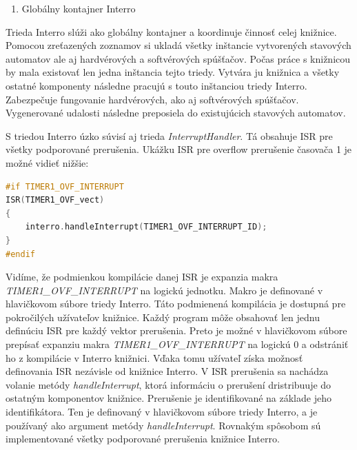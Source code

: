 \begin{enumerate}[resume]
    \item Globálny kontajner Interro
\end{enumerate}

Trieda Interro slúži ako globálny kontajner a koordinuje činnosť celej knižnice. Pomocou zreťazených zoznamov si ukladá všetky inštancie vytvorených stavových automatov
ale aj hardvérových a softvérových spúšťačov. Počas práce s knižnicou by mala existovať len jedna inštancia tejto triedy. Vytvára ju knižnica a všetky ostatné komponenty
následne pracujú s touto inštanciou triedy Interro. Zabezpečuje fungovanie hardvérových, ako aj softvérových spúšťačov. Vygenerované udalosti následne preposiela do
existujúcich stavových automatov. \par
S triedou Interro úzko súvisí aj trieda \textit{InterruptHandler}. Tá obsahuje ISR pre všetky podporované prerušenia. Ukážku ISR pre overflow prerušenie časovača 1
je možné vidieť nižšie:
\begin{lstlisting}[language=c++]  
#if TIMER1_OVF_INTERRUPT
ISR(TIMER1_OVF_vect)
{
    interro.handleInterrupt(TIMER1_OVF_INTERRUPT_ID);
}
#endif
\end{lstlisting}


Vidíme, že podmienkou kompilácie danej ISR je expanzia makra \\ \textit{TIMER1\_OVF\_INTERRUPT} na logickú jednotku. Makro je definované v hlavičkovom súbore triedy Interro.
Táto podmienená kompilácia je dostupná pre pokročilých užívateľov knižnice. Každý program môže obsahovať len jednu definúciu ISR pre každý vektor prerušenia. Preto je
možné v hlavičkovom súbore prepísať expanziu makra \textit{TIMER1\_OVF\_INTERRUPT} na logickú 0 a odstrániť ho z kompilácie v Interro knižnici. Vďaka tomu užívateľ získa
možnosť definovania ISR nezávisle od knižnice Interro. V ISR prerušenia sa nachádza volanie metódy \textit{handleInterrupt}, ktorá informáciu o prerušení dristribuuje
do ostatným komponentov knižnice. Prerušenie je identifikované na základe jeho identifikátora. Ten je definovaný v hlavičkovom súbore triedy Interro, a je používaný
ako argument metódy \textit{handleInterrupt}.
Rovnakým spôsobom sú implementované všetky podporované prerušenia knižnice Interro.

